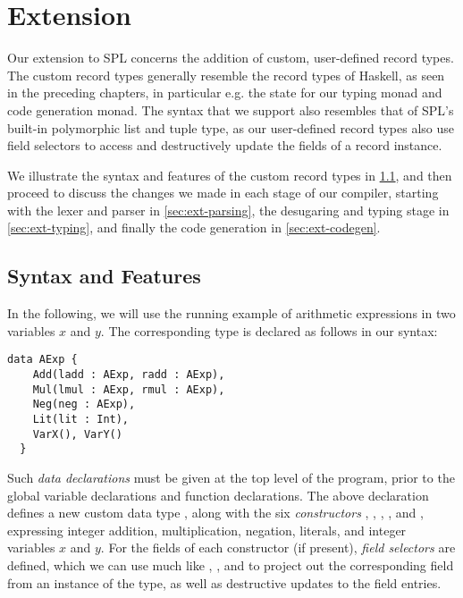 \chapter{Extension} \label{chp:extension}

Our extension to SPL concerns the addition of custom, user-defined
record types. The custom record types generally resemble the record types of
Haskell, as seen in the preceding chapters, in particular e.g. the state for our
typing monad and code generation monad.
The syntax that we support also resembles that of SPL's built-in polymorphic
list and tuple type, as our user-defined record types also use field selectors
to access and destructively update the fields of a record instance.

We illustrate the syntax and features of the custom record types in
\cref{sec:ext-syntax-features}, and then proceed to discuss the changes we made
in each stage of our compiler, starting with the lexer and parser in
\cref{sec:ext-parsing}, the desugaring and typing stage in \cref{sec:ext-typing},
and finally the code generation in \cref{sec:ext-codegen}.

\section{Syntax and Features} \label{sec:ext-syntax-features}
In the following, we will use the running example of arithmetic expressions in
two variables $x$ and $y$. The corresponding type is declared as follows in our
syntax:
\begin{lstlisting}[language=SPL]
  data AExp {
    Add(ladd : AExp, radd : AExp),
    Mul(lmul : AExp, rmul : AExp),
    Neg(neg : AExp),
    Lit(lit : Int),
    VarX(), VarY()
  }
\end{lstlisting}

Such \emph{data declarations} must be given at the top level of the program,
prior to the global variable declarations and function declarations.
The above declaration defines a new custom data type , along with the
six \emph{constructors} , , , , 
and , expressing integer addition, multiplication, negation, literals,
and integer variables $x$ and $y$.
For the fields of each constructor (if present), \emph{field selectors} are
defined, which we can use much like , ,  and
 to project out the corresponding field from an instance of the type,
as well as destructive updates to the field entries.

